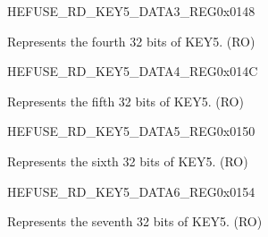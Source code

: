\begin{register}{H}{EFUSE\_RD\_KEY5\_DATA3\_REG}{0x{}0148}\label{regdesc:EFUSERDKEY5DATA3REG}
%
\regnewline%
\begin{regdesc}\begin{reglist}
\label{fielddesc:EFUSEKEY5DATA3}\item [EFUSE\_KEY5\_DATA3] Represents the fourth 32 bits of KEY5. (RO)
\end{reglist}\end{regdesc}
\end{register}


\begin{register}{H}{EFUSE\_RD\_KEY5\_DATA4\_REG}{0x{}014C}\label{regdesc:EFUSERDKEY5DATA4REG}
%
\regnewline%
\begin{regdesc}\begin{reglist}
\label{fielddesc:EFUSEKEY5DATA4}\item [EFUSE\_KEY5\_DATA4] Represents the fifth 32 bits of KEY5. (RO)
\end{reglist}\end{regdesc}
\end{register}


\begin{register}{H}{EFUSE\_RD\_KEY5\_DATA5\_REG}{0x{}0150}\label{regdesc:EFUSERDKEY5DATA5REG}
%
\regnewline%
\begin{regdesc}\begin{reglist}
\label{fielddesc:EFUSEKEY5DATA5}\item [EFUSE\_KEY5\_DATA5] Represents the sixth 32 bits of KEY5. (RO)
\end{reglist}\end{regdesc}
\end{register}


\begin{register}{H}{EFUSE\_RD\_KEY5\_DATA6\_REG}{0x{}0154}\label{regdesc:EFUSERDKEY5DATA6REG}
%
\regnewline%
\begin{regdesc}\begin{reglist}
\label{fielddesc:EFUSEKEY5DATA6}\item [EFUSE\_KEY5\_DATA6] Represents the seventh 32 bits of KEY5. (RO)
\end{reglist}\end{regdesc}
\end{register}


